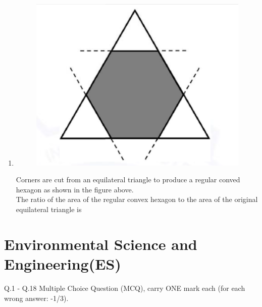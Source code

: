 \documentclass[journal]{IEEEtran}
\begin{document}
\begin{enumerate}[start=1]
\item 
\begin{figure}[H]
    \centering
    \includegraphics[width=0.5\columnwidth]{figs/image(q10).png}
\end{figure}
Corners are cut from an equilateral triangle to produce a regular conved hexagon as shown in the figure above.\\
The ratio of the area of the regular convex hexagon to the area of the original equilateral triangle is
\hfill{}
\begin{enumerate}
\end{enumerate}

\end{enumerate}

\section{Environmental Science and Engineering(ES)}
\bigskip
Q.1 - Q.18 Multiple Choice Question (MCQ), carry ONE mark each (for each wrong answer: -1/3).
\bigskip
\end{document}
